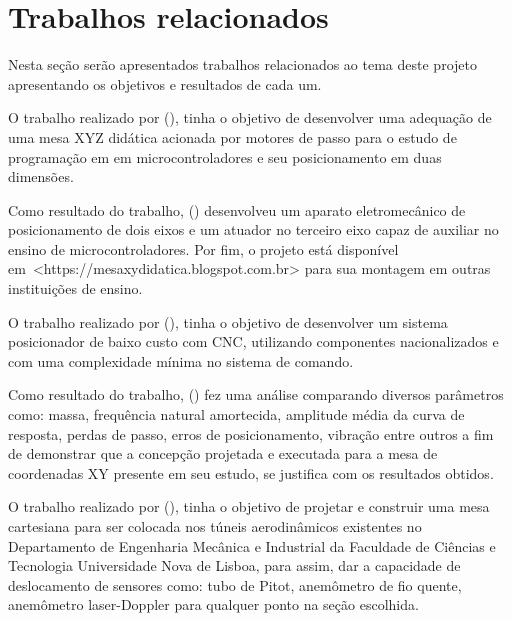 \section{Trabalhos relacionados}\label{sec:trabalhos}

Nesta seção serão apresentados trabalhos relacionados ao tema deste projeto apresentando os objetivos e resultados 
de cada um.

O trabalho realizado por \citeauthor{butignol2017adequaccao} (\citeyear{butignol2017adequaccao}), 
tinha o objetivo de desenvolver uma adequação de uma mesa XYZ didática acionada por motores 
de passo para o estudo de programação em em microcontroladores e seu posicionamento em duas dimensões.

Como resultado do trabalho, \citeauthor{butignol2017adequaccao} (\citeyear{butignol2017adequaccao}) 
desenvolveu um aparato eletromecânico de posicionamento de dois eixos e um atuador no terceiro eixo 
capaz de auxiliar no ensino de microcontroladores. Por fim, o projeto está disponível 
em~<https://mesaxydidatica.blogspot.com.br> para sua montagem em outras instituições de ensino.

O trabalho realizado por \citeauthor{camargo1988mesa} (\citeyear{camargo1988mesa}), tinha o objetivo de 
desenvolver um sistema posicionador de baixo custo com \ac{CNC}, utilizando componentes 
nacionalizados e com uma complexidade mínima no sistema de comando.

Como resultado do trabalho, \citeauthor{camargo1988mesa} (\citeyear{camargo1988mesa}) fez uma análise 
comparando diversos parâmetros como: massa, frequência natural amortecida, amplitude média da curva de 
resposta, perdas de passo, erros de posicionamento, vibração entre outros a fim de demonstrar que a 
concepção projetada e executada para a mesa de coordenadas XY presente em seu estudo, se 
justifica com os resultados obtidos.

O trabalho realizado por \citeauthor{ramos2018desenvolvimento} (\citeyear{ramos2018desenvolvimento}), 
tinha o objetivo de projetar e construir uma mesa cartesiana para ser colocada nos túneis 
aerodinâmicos existentes no Departamento de Engenharia Mecânica e Industrial da Faculdade de Ciências e 
Tecnologia Universidade Nova de Lisboa, para assim, dar a capacidade de deslocamento de sensores como: tubo de Pitot, 
anemômetro de fio quente, anemômetro laser-Doppler para qualquer ponto na seção escolhida.

